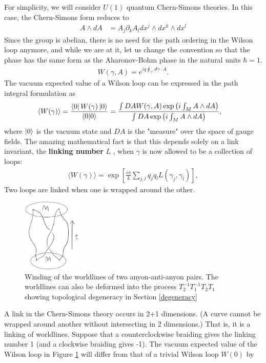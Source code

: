 \documentclass[aps,nofootinbib]{revtex4}
\begin{document}
For simplicity, we will consider $U(1)$ quantum Chern-Simons theories. In this case, the Chern-Simons form reduces to
\begin{align}
A \wedge dA &= A_j \partial_k A_l dx^j \wedge dx^k \wedge dx^l
\end{align}
Since the group is abelian, there is no need for the path ordering in the Wilson loop anymore, and while we are at it, let us change the convention so that the phase has the same form as the Aharonov-Bohm phase in the natural units $\hbar = 1$.
\begin{align}\label{physicist wilson loop}
W(\gamma,A) = e^{iq\oint_{\gamma'} d\gamma \cdot A}. 
\end{align}
The vacuum expected value of a Wilson loop can be expressed in the path integral formulation as
\begin{align}
\langle W(\gamma) \rangle  
	&= \frac{ \bra{0} W(\gamma) \ket{0} }{ \braket{0|0} }
	= \frac{\int DA W(\gamma,A) \exp \left( i\int_M A \wedge dA \right)}{\int DA \exp \left( i\int_M A \wedge dA \right)}, 
\end{align}
where $\ket{0}$ is the vacuum state and $DA$ is the "measure" over the space of gauge fields. The amazing mathematical fact is that this depends solely on a link invariant, the {\bf linking number} $L$ \cite{Pachos12}, when $\gamma$ is now allowed to be a collection of loops:
\begin{align}\label{link formula}
\langle W (\gamma) \rangle = \exp \left[ \frac{i \pi}{k} \sum_{j,l} q_j q_l L(\gamma_j,\gamma_l) \right],
\end{align}
Two loops are linked when one is wrapped around the other. 
\begin{figure}\label{winding}
\includegraphics[width=0.25\textwidth]{linking.png}
\caption{Winding of the worldlines of two anyon-anti-anyon pairs. The worldlines can also be deformed into the process $T_2^{-1} T_1^{-1} T_2 T_1$ showing topological degeneracy in Section \ref{degeneracy}}
\end{figure}
A link in the Chern-Simons theory occurs in 2+1 dimensions. (A curve cannot be wrapped around another without intersecting in 2 dimensions.) That is, it is a linking of worldlines. Suppose that a counterclockwise braiding gives the linking number 1 (and a clockwise braiding gives -1). The vacuum expected value of the Wilson loop in Figure \ref{winding} will differ from that of a trivial Wilson loop $W(0)$ by
\end{document}
